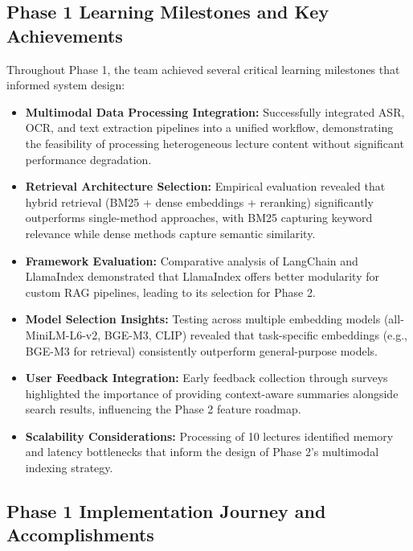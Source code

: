 \subsection{Phase 1 Learning Milestones and Key Achievements}

Throughout Phase 1, the team achieved several critical learning milestones that informed system design:

\begin{itemize}
    \item \textbf{Multimodal Data Processing Integration:} Successfully integrated ASR, OCR, and text extraction pipelines into a unified workflow, demonstrating the feasibility of processing heterogeneous lecture content without significant performance degradation.
    
    \item \textbf{Retrieval Architecture Selection:} Empirical evaluation revealed that hybrid retrieval (BM25 + dense embeddings + reranking) significantly outperforms single-method approaches, with BM25 capturing keyword relevance while dense methods capture semantic similarity.
    
    \item \textbf{Framework Evaluation:} Comparative analysis of LangChain and LlamaIndex demonstrated that LlamaIndex offers better modularity for custom RAG pipelines, leading to its selection for Phase 2.
    
    \item \textbf{Model Selection Insights:} Testing across multiple embedding models (all-MiniLM-L6-v2, BGE-M3, CLIP) revealed that task-specific embeddings (e.g., BGE-M3 for retrieval) consistently outperform general-purpose models.
    
    \item \textbf{User Feedback Integration:} Early feedback collection through surveys highlighted the importance of providing context-aware summaries alongside search results, influencing the Phase 2 feature roadmap.
    
    \item \textbf{Scalability Considerations:} Processing of 10 lectures identified memory and latency bottlenecks that inform the design of Phase 2's multimodal indexing strategy.
\end{itemize}
\subsection{Phase 1 Implementation Journey and Accomplishments}

